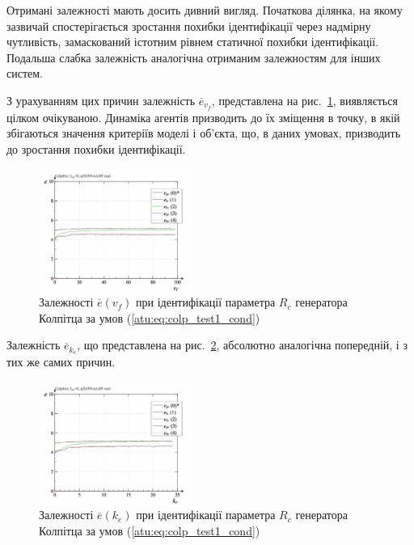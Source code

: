 Отримані залежності мають досить дивний вигляд. Початкова
ділянка, на якому зазвичай спостерігається зростання похибки
ідентифікації через надмірну чутливість, замаскований істотним
рівнем статичної похибки ідентифікації. Подальша слабка
залежність аналогічна отриманим залежностям для інших систем.

З урахуванням цих причин залежність
$\overline{e}_{v_f} $, представлена на рис.~\ref{atu:f:colp_real_id_p_v_f_d_0},
виявляється цілком очікуваною. Динаміка агентів призводить
до їх зміщення в точку, в якій збігаються значення критеріїв
моделі і об'єкта, що, в даних умовах, призводить до зростання
похибки ідентифікації.

\begin{figure}[htb!]
  \centerline{\includegraphics[width=0.45\textwidth]{p/r/colp_real_id-p_v_f_d_0.png} }
\caption{Залежності $ \overline{e} (v_f) $ при ідентифікації параметра $ R_c $ генератора Колпітца за умов (\ref{atu:eq:colp_test1_cond})}
  \label{atu:f:colp_real_id_p_v_f_d_0}
\end{figure}

Залежність
$\overline{e}_{k_e} $, що представлена на рис.~\ref{atu:f:colp_real_id_p_k_e_d_0},
абсолютно аналогічна попередній, і з тих же самих причин.

\begin{figure}[htb!]
  \centerline{\includegraphics[width=0.45\textwidth]{p/r/colp_real_id-p_k_e_d_0.png} }
\caption{Залежності $ \overline{e} (k_e) $ при ідентифікації параметра $ R_c $ генератора Колпітца за умов (\ref{atu:eq:colp_test1_cond})}
\label{atu:f:colp_real_id_p_k_e_d_0}
\end{figure}

